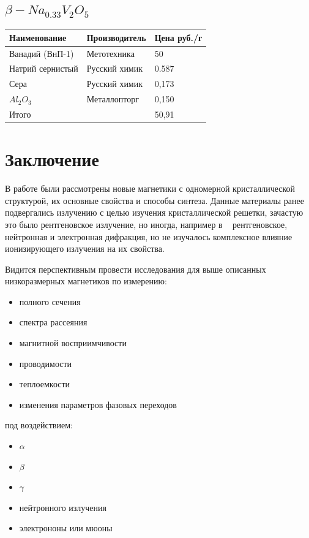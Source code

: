 \documentclass[11pt]{article}
\begin{document}
\subsection{$\beta-Na_{0.33}V_2O_5$}

\begin{tabular}{|l|l|l|}
\hline
	Наименование  & Производитель & Цена руб./г\\
\hline
	Ванадий (ВнП-1) & Метотехника & 50 \\
\hline
	Натрий сернистый & Русский химик & 0.587\\
\hline
	Сера & Русский химик & 0,173 \\
\hline
	$Al_2O_3$ & Металлопторг & 0,150 \\	
\hline
	Итого & & 50,91\\
\hline
\end{tabular}	

\section{Заключение}
В работе были рассмотрены новые магнетики с одномерной кристаллической структурой, их основные свойства и способы синтеза. Данные материалы ранее подвергались излучению с целью изучения кристаллической решетки, зачастую это было рентгеновское излучение, но иногда, например в ~\cite{dussarrat2002} рентгеновское, нейтронная и электронная дифракция, но не изучалось комплексное влияние ионизирующего излучения на их свойства. 

Видится перспективным провести исследования для выше описанных низкоразмерных магнетиков по измерению:

\begin{itemize} 
\item полного сечения
\item спектра рассеяния
\item магнитной восприимчивости
\item проводимости
\item теплоемкости
\item изменения параметров фазовых переходов
\end{itemize} 

под воздействием:
\begin{itemize} 
\item $\alpha$
\item $\beta$
\item $\gamma$
\item нейтронного излучения
\item электрононы или мюоны
\end{itemize} 
\end{document}
